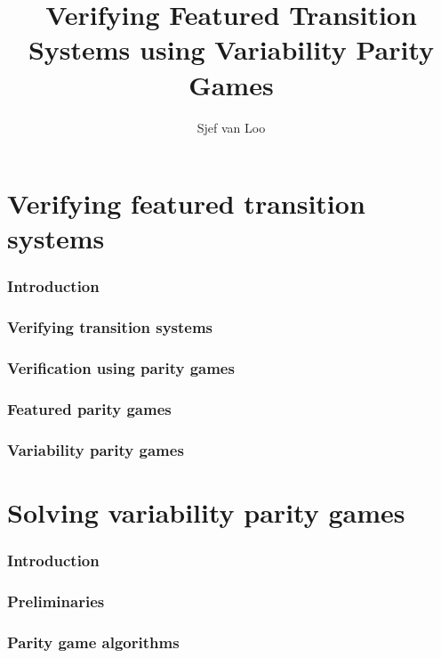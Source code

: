\documentclass[]{article}
\title{Verifying Featured Transition Systems using Variability Parity Games}
\author{Sjef van Loo}
\begin{document}
\maketitle

\tableofcontents

\part{Verifying featured transition systems}
\label{part:verifying}
\section{Introduction}


\section{Verifying transition systems}


\section{Verification using parity games}


\section{Featured parity games}


\section{Variability parity games}

\pagebreak
\part{Solving variability parity games}
\section{Introduction}


\section{Preliminaries}


\section{Parity game algorithms}

\end{document}
